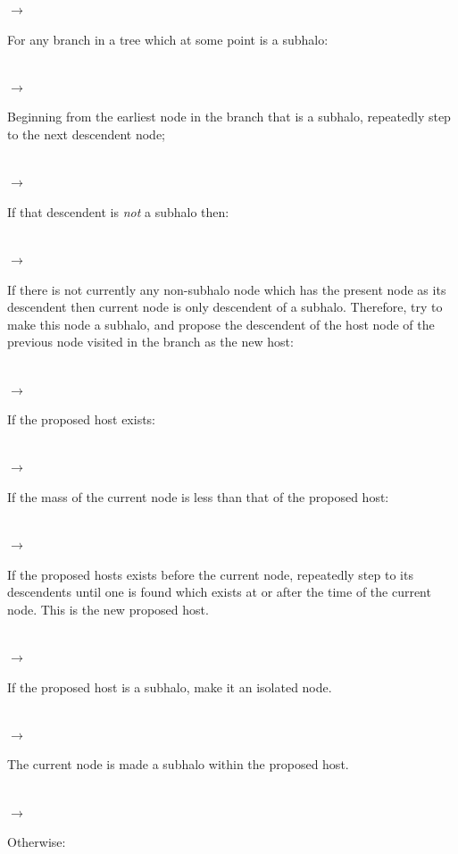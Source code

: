\begin{itemize}
\noindent\hspace{ 5mm} $\rightarrow$ \parbox[t]{150mm}{For any branch in a tree which at some point is a subhalo:}\\

\noindent\hspace{10mm} $\rightarrow$ \parbox[t]{145mm}{Beginning from the earliest node in the branch that is a subhalo, repeatedly step to the next descendent node;}\\

\noindent\hspace{10mm} $\rightarrow$ \parbox[t]{145mm}{If that descendent is \emph{not} a subhalo then:}\\

\noindent\hspace{15mm} $\rightarrow$ \parbox[t]{140mm}{If there is not currently any non-subhalo node which has the present node as its descendent then current node is only descendent of a subhalo. Therefore, try to make this node a subhalo, and propose the descendent of the host node of the previous node visited in the branch as the new host:}\\

\noindent\hspace{20mm} $\rightarrow$ \parbox[t]{135mm}{If the proposed host exists:}\\

\noindent\hspace{25mm} $\rightarrow$ \parbox[t]{130mm}{If the mass of the current node is less than that of the proposed host:}\\

\noindent\hspace{30mm} $\rightarrow$ \parbox[t]{125mm}{If the proposed hosts exists before the current node, repeatedly step to its descendents until one is found which exists at or after the time of the current node. This is the new proposed host.}\\

\noindent\hspace{30mm} $\rightarrow$ \parbox[t]{125mm}{If the proposed host is a subhalo, make it an isolated node.}\\

\noindent\hspace{30mm} $\rightarrow$ \parbox[t]{125mm}{The current node is made a subhalo within the proposed host.}\\

\noindent\hspace{25mm} $\rightarrow$ \parbox[t]{130mm}{Otherwise:}\\


\end{itemize}
